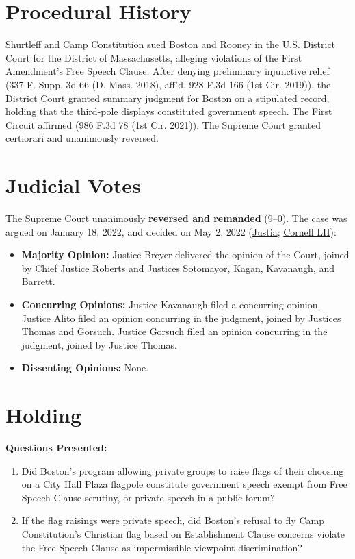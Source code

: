 \documentclass[12pt]{article}
\begin{document}
\section{Procedural History}
Shurtleff and Camp Constitution sued Boston and Rooney in the U.S. District Court for the District of Massachusetts, alleging violations of the First Amendment's Free Speech Clause. After denying preliminary injunctive relief (337 F. Supp. 3d 66 (D. Mass. 2018), aff'd, 928 F.3d 166 (1st Cir. 2019)), the District Court granted summary judgment for Boston on a stipulated record, holding that the third-pole displays constituted government speech. The First Circuit affirmed (986 F.3d 78 (1st Cir. 2021)). The Supreme Court granted certiorari and unanimously reversed.

\section{Judicial Votes}
The Supreme Court unanimously \textbf{reversed and remanded} (9--0). The case was argued on January 18, 2022, and decided on May 2, 2022 (\href{https://supreme.justia.com/cases/federal/us/596/20-1800/}{Justia}; \href{https://www.law.cornell.edu/supremecourt/text/20-1800}{Cornell LII}):

\begin{itemize}
    \item \textbf{Majority Opinion:} Justice Breyer delivered the opinion of the Court, joined by Chief Justice Roberts and Justices Sotomayor, Kagan, Kavanaugh, and Barrett.
    \item \textbf{Concurring Opinions:} Justice Kavanaugh filed a concurring opinion. Justice Alito filed an opinion concurring in the judgment, joined by Justices Thomas and Gorsuch. Justice Gorsuch filed an opinion concurring in the judgment, joined by Justice Thomas.
    \item \textbf{Dissenting Opinions:} None.
\end{itemize}

\section{Holding}
\textbf{Questions Presented:}

\begin{enumerate}
  \item Did Boston's program allowing private groups to raise flags of their choosing on a City Hall Plaza flagpole constitute government speech exempt from Free Speech Clause scrutiny, or private speech in a public forum?
  \item If the flag raisings were private speech, did Boston's refusal to fly Camp Constitution's Christian flag based on Establishment Clause concerns violate the Free Speech Clause as impermissible viewpoint discrimination?
\end{enumerate}
\end{document}
